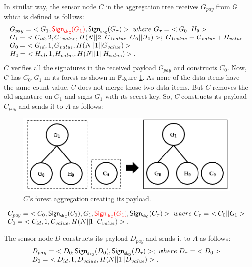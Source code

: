 	In similar way, the sensor node $C$ in the aggregation tree receives $G_{pay}$ from $G$ which is defined as follows:
	\begin{equation*}
		\begin{array}{l}
			G_{pay} =\ <G_{1},\textcolor{red}{\textsf{Sign}_{\sf{sk}_{G}}(G_{1})}, \textsf{Sign}_{\sf{sk}_{G}}(G_{\tau})>\ where\ G_{\tau} =\ <G_{0} || H_{0}>\\
			G_{1} =\ < G_{id}, 2, G_{1value}, H(N||2||G_{1value}||G_{0}||H_{0})>;\ G_{1value} = G_{value} + H_{value} \\
			G_{0} =\ <G_{id}, 1, G_{value}, H(N||1||G_{value})>\\
			H_{0} =\ <H_{id}, 1, H_{value}, H(N||1||H_{value})>.
		\end{array}
	\end{equation*}
	$C$ verifies all the signatures in the received payload $G_{pay}$ and constructs $C_{0}$.
	Now, $C$ has $C_{0},G_{1}$ in its forest as shown in Figure \ref{fig:c-forest-payload}. 
	As none of the data-items have the same count value, $C$ does not merge those two data-items.
	But $C$ removes the old signature on $G_{1}$ and signs $G_{1}$ with its secret key.
	So, $C$ constructs its payload $C_{pay}$ and sends it to $A$ as follows:
	\begin{figure}[h!]
		\centering
		\includegraphics{images/c-forest-payload.png}
		\caption{$C$'s forest aggregation creating its payload.}
		\label{fig:c-forest-payload}
	\end{figure}
	\begin{equation*}
		\begin{array}{l}
			C_{pay} =\ <C_{0},\textsf{Sign}_{\sf{sk}_{C}}(C_{0}),G_{1},\textcolor{red}{\textsf{Sign}_{\sf{sk}_{C}}(G_{1})}, \textsf{Sign}_{\sf{sk}_{C}}(C_{\tau})>\ where\ C_{\tau} =\ <C_{0} || G_{1}>\\
			C_{0} =\ <C_{id}, 1, C_{value}, H(N||1||C_{value})>.
		\end{array}
	\end{equation*}

	The sensor node $D$ constructs its payload $D_{pay}$ and sends it to $A$ as follows:
	\begin{equation*}
		\begin{array}{l}
			D_{pay} =\ <D_{0}, \textsf{Sign}_{\sf{sk}_{D}}(D_{0}), \textsf{Sign}_{\sf{sk}_{D}}(D_{\tau})>;\ where\ D_{\tau} =\ <D_{0}>\\
			D_{0} =\ <D_{id},1,D_{value},H(N||1||D_{value})>.
		\end{array}
	\end{equation*}

